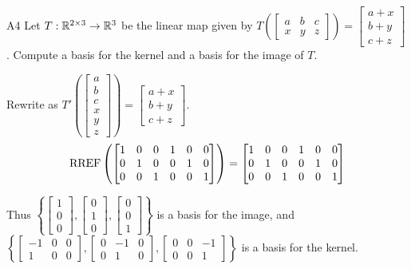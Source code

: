 \documentclass{sbgLAquiz}
\begin{document}
\begin{problem}{A4}
Let $T: \mathbb{R}^{2\times 3} \rightarrow \mathbb{R}^3$ be the linear map given by \(
  T\left(\begin{bmatrix} a & b & c \\ x & y & z \end{bmatrix} \right) =
  \begin{bmatrix}
    a+x \\ b+y \\ c+z
  \end{bmatrix}
\). Compute a basis for the kernel and a basis for the image of $T$.
\end{problem}
\begin{solution}
Rewrite as \(
  T'\left(\begin{bmatrix} a \\ b \\ c \\ x \\ y \\ z \end{bmatrix} \right) =
  \begin{bmatrix}
    a+x \\ b+y \\ c+z
  \end{bmatrix}
\).
\[
  \operatorname{RREF} \left( \begin{bmatrix}
    1 & 0 & 0 & 1 & 0 & 0\\
    0 & 1 & 0 & 0 & 1 & 0\\
    0 & 0 & 1 & 0 & 0 & 1
  \end{bmatrix} \right) = \begin{bmatrix}
    1 & 0 & 0 & 1 & 0 & 0\\
    0 & 1 & 0 & 0 & 1 & 0\\
    0 & 0 & 1 & 0 & 0 & 1
  \end{bmatrix}
\]

Thus \(\left\{
  \begin{bmatrix} 1 \\ 0 \\ 0 \end{bmatrix},
  \begin{bmatrix} 0 \\ 1 \\ 0 \end{bmatrix},
  \begin{bmatrix} 0 \\ 0 \\ 1 \end{bmatrix}
\right\} \) is a basis for the image, and \(\left\{
  \begin{bmatrix} -1 & 0 & 0 \\ 1 & 0 & 0 \end{bmatrix},
  \begin{bmatrix} 0 & -1 & 0 \\ 0 & 1 & 0 \end{bmatrix},
  \begin{bmatrix} 0 & 0 & -1 \\ 0 & 0 & 1 \end{bmatrix}
\right\} \) is a basis for the kernel.
\end{solution}
\end{document}
